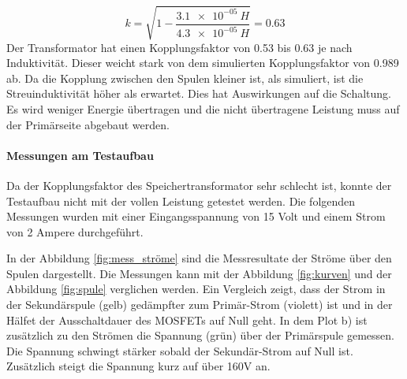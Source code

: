 \begin{equation}\label{eq:berechnung_k2}
k = \sqrt{1-\frac{\SI{3.1e-05}{H}}{\SI{4.3e-05}{H}}}=0.63
\end{equation}
Der Transformator hat einen Kopplungsfaktor von 0.53 bis 0.63 je nach Induktivität. Dieser weicht stark von dem simulierten Kopplungsfaktor von 0.989 ab. Da die Kopplung zwischen den Spulen kleiner ist, als simuliert, ist die Streuinduktivität höher als erwartet. Dies hat Auswirkungen auf die Schaltung. Es wird weniger Energie übertragen und die nicht übertragene Leistung muss auf der Primärseite abgebaut werden.  

\paragraph{Messungen am Testaufbau}
Da der Kopplungsfaktor des Speichertransformator sehr schlecht ist, konnte der Testaufbau nicht mit der vollen Leistung getestet werden. Die folgenden Messungen wurden mit einer Eingangsspannung von 15 Volt und einem Strom von 2 Ampere durchgeführt.   

In der Abbildung \ref{fig:mess_ströme} sind die Messresultate der Ströme über den Spulen dargestellt. Die Messungen kann mit der Abbildung \ref{fig:kurven} und der Abbildung \ref{fig:spule} verglichen werden. Ein Vergleich zeigt, dass der Strom in der Sekundärspule (gelb) gedämpfter zum Primär-Strom (violett) ist und in der Hälfet der Ausschaltdauer des MOSFETs auf Null geht. In dem Plot b) ist zusätzlich zu den Strömen die Spannung (grün) über der Primärspule gemessen. Die Spannung schwingt stärker sobald der Sekundär-Strom auf Null ist. Zusätzlich steigt die Spannung kurz auf über 160V an. 



